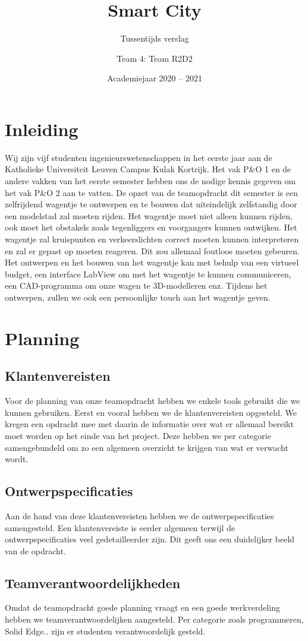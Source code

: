 \documentclass[a4paper,twoside,kulak]{kulakreport}
\title{Smart City}
\subtitle{Tussentijds verslag}
\author{Team 4: Team R2D2}
\institute{Matthijs Deforche, Karl Van Holder, Thomas Varheust, Kobe De Weerdt, Yaron Verhulst}
\date{Academiejaar 2020 -- 2021}
\begin{document}
	\titlepage
	\chapter*{Inleiding}
	Wij zijn vijf studenten ingenieurswetenschappen in het eerste jaar aan de Katholieke Universiteit Leuven Campus Kulak Kortrijk.
	Het vak P\&O 1 en de andere vakken van het eerste semester hebben ons de nodige kennis gegeven om het vak P\&O 2 aan te vatten. 
	De opzet van de teamopdracht dit semester is een zelfrijdend wagentje te ontwerpen en te bouwen dat uiteindelijk zelfstandig door een modelstad zal moeten rijden. Het wagentje moet niet alleen kunnen rijden, ook moet het obstakels zoals tegenliggers en voorgangers kunnen ontwijken. Het wagentje zal kruispunten en verkeerslichten correct moeten kunnen interpreteren en zal er gepast op moeten reageren. Dit zou allemaal foutloos moeten gebeuren. Het ontwerpen en het bouwen van het wagentje kan met behulp van een virtueel budget, een interface LabView om met het wagentje te kunnen communiceren, een CAD-programma om onze wagen te 3D-modelleren enz. 
	Tijdens het ontwerpen, zullen we ook een persoonlijke touch aan het wagentje geven. 
	
	
	\chapter*{Planning}
	\section{Klantenvereisten}
	Voor de planning van onze teamopdracht hebben we enkele tools gebruikt die we kunnen gebruiken. Eerst en vooral hebben we de klantenvereisten opgesteld. We kregen een opdracht mee met daarin de informatie over wat er allemaal bereikt moet worden op het einde van het project. Deze hebben we per categorie samengebundeld om zo een algemeen overzicht te krijgen van wat er verwacht wordt. 
	\section{Ontwerpspecificaties}Aan de hand van deze klantenvereisten hebben we de ontwerpspecificaties samengesteld. Een klantenvereiste is eerder algemeen terwijl de ontwerpspecificaties veel gedetailleerder zijn. Dit geeft ons een duidelijker beeld van de opdracht. 
	\section{Teamverantwoordelijkheden}Omdat de teamopdracht goede planning vraagt en een goede werkverdeling hebben we teamverantwoordelijken aangesteld. Per categorie zoals programmeren, Solid Edge.. zijn er studenten verantwoordelijk gesteld. 
\end{document}

